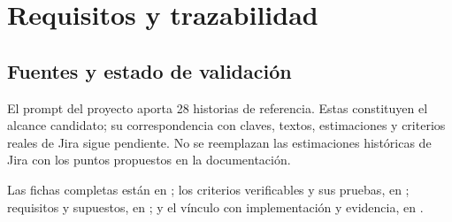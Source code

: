 \chapter{Requisitos y trazabilidad}
\section{Fuentes y estado de validación}
El prompt del proyecto aporta 28 historias de referencia. Estas constituyen el alcance candidato; su correspondencia con claves, textos, estimaciones y criterios reales de Jira sigue pendiente. No se reemplazan las estimaciones históricas de Jira con los puntos propuestos en la documentación.

Las fichas completas están en ; los criterios verificables y sus pruebas, en ; requisitos y supuestos, en ; y el vínculo con implementación y evidencia, en .

